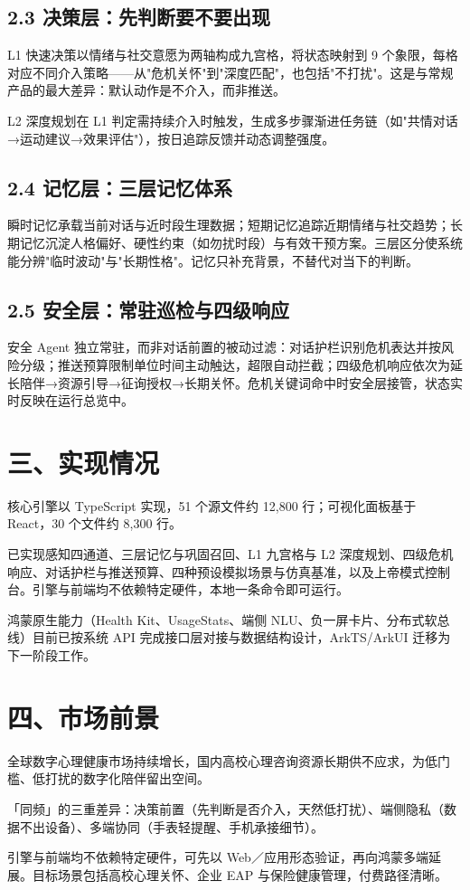 \documentclass[fontset=windows,a4paper,UTF8]{ctexart}
\begin{document}
\subsection*{2.3 决策层：先判断要不要出现}
\noindent L1 快速决策以情绪与社交意愿为两轴构成九宫格，将状态映射到 9 个象限，每格对应不同介入策略——从"危机关怀"到"深度匹配"，也包括"不打扰"。这是与常规产品的最大差异：默认动作是不介入，而非推送。

L2 深度规划在 L1 判定需持续介入时触发，生成多步骤渐进任务链（如"共情对话→运动建议→效果评估"），按日追踪反馈并动态调整强度。

\subsection*{2.4 记忆层：三层记忆体系}
\noindent 瞬时记忆承载当前对话与近时段生理数据；短期记忆追踪近期情绪与社交趋势；长期记忆沉淀人格偏好、硬性约束（如勿扰时段）与有效干预方案。三层区分使系统能分辨"临时波动"与"长期性格"。记忆只补充背景，不替代对当下的判断。

\subsection*{2.5 安全层：常驻巡检与四级响应}
\noindent 安全 Agent 独立常驻，而非对话前置的被动过滤：对话护栏识别危机表达并按风险分级；推送预算限制单位时间主动触达，超限自动拦截；四级危机响应依次为延长陪伴→资源引导→征询授权→长期关怀。危机关键词命中时安全层接管，状态实时反映在运行总览中。

\section*{三、实现情况}
\noindent 核心引擎以 TypeScript 实现，51 个源文件约 12,800 行；可视化面板基于 React，30 个文件约 8,300 行。

已实现感知四通道、三层记忆与巩固召回、L1 九宫格与 L2 深度规划、四级危机响应、对话护栏与推送预算、四种预设模拟场景与仿真基准，以及上帝模式控制台。引擎与前端均不依赖特定硬件，本地一条命令即可运行。

鸿蒙原生能力（Health Kit、UsageStats、端侧 NLU、负一屏卡片、分布式软总线）目前已按系统 API 完成接口层对接与数据结构设计，ArkTS/ArkUI 迁移为下一阶段工作。

\section*{四、市场前景}
\noindent 全球数字心理健康市场持续增长，国内高校心理咨询资源长期供不应求，为低门槛、低打扰的数字化陪伴留出空间。

「同频」的三重差异：决策前置（先判断是否介入，天然低打扰）、端侧隐私（数据不出设备）、多端协同（手表轻提醒、手机承接细节）。

引擎与前端均不依赖特定硬件，可先以 Web／应用形态验证，再向鸿蒙多端延展。目标场景包括高校心理关怀、企业 EAP 与保险健康管理，付费路径清晰。
\end{document}
